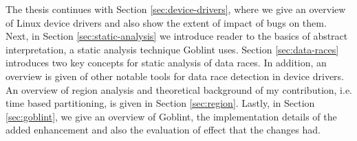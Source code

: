 \documentclass[..thesis.tex]{subfiles}
\begin{document}
The thesis continues with Section \ref{sec:device-drivers}, where we give an overview of Linux device drivers and also show the extent of impact of bugs on them.
Next, in Section \ref{sec:static-analysis} we introduce reader to the basics of abstract interpretation, a static analysis technique Goblint uses.
Section \ref{sec:data-races} introduces two key concepts for static analysis of data races.
In addition, an overview is given of other notable tools for data race detection in device drivers. An overview of region analysis and theoretical background of my contribution, i.e.
time based partitioning, is given in Section \ref{sec:region}. Lastly, in Section \ref{sec:goblint}, we give an overview of Goblint,
the implementation details of the added enhancement and also the evaluation of effect that the changes had.  
\end{document}
